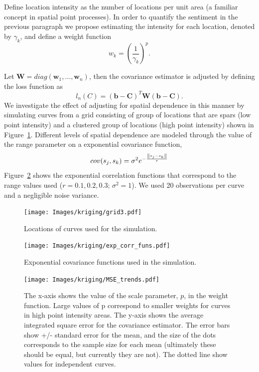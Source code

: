  Define location intensity as the number of locations per unit area (a familiar concept in spatial point processes). In order to quantify the sentiment in the previous paragraph we propose estimating the intensity for each location, denoted by $\gamma_k$, and define a weight function
 \begin{equation}
 	w_k = \left(\frac{1}{\gamma_k}\right)^p.
 \end{equation}
 
 Let $\mathbf{W} = diag(\mathbf{w}_1, \dots, \mathbf{w}_n)$, then the covariance estimator is adjusted by defining the loss function as
 \begin{equation}
 l_{n}(C)= (\mathbf{b} - \mathbf{C})^T\mathbf{W}(\mathbf{b} - \mathbf{C}).
 \label{eq:diag weighted loss function}
 \end{equation}
 We investigate the effect of adjusting for spatial dependence in this manner by simulating curves from a grid consisting of group of locations that are spars (low point intensity) and a clustered group of locations (high point intensity) shown in Figure~\ref{fig:grid3}. Different levels of spatial dependence are modeled through the value of the range parameter on a exponential covariance function,
 \[
 			cov(s_j, s_k) = \sigma^2e^{-\frac{\left\|s_j - s_k\right\|}{r}}
 \] 
 Figure~\ref{fig:exp_corr_funs} shows the exponential correlation functions that correspond to the range values used ($r = 0.1, 0.2, 0.3$; $\sigma^2=1$). We used 20 observations per curve and a negligible noise variance. 
 
 
 
 
\begin{figure}
\begin{center}
\texttt{[image: Images/kriging/grid3.pdf]}
\end{center}
\caption{Locations of curves used for the simulation.}
\label{fig:grid3}
\end{figure} 

\begin{figure}
\begin{center}
\texttt{[image: Images/kriging/exp\_corr\_funs.pdf]}
\end{center}
\caption{Exponential covariance functions used in the simulation.}
\label{fig:exp_corr_funs}
\end{figure} 
 
 
\begin{figure}
\begin{center}
\texttt{[image: Images/kriging/MSE\_trends.pdf]}
\end{center}
\caption{The x-axis shows the value of the scale parameter, $p$, in the weight function. Large values of p correspond to smaller weights for curves in high point intensity areas. The y-axis shows the average integrated square error for the covariance estimator. The error bars show +/- standard error for the mean, and the size of the dots corresponds to the sample size for each mean (ultimately these should be equal, but currently they are not). The dotted line show values for independent curves.}
\label{fig:MSE_trends}
\end{figure}

